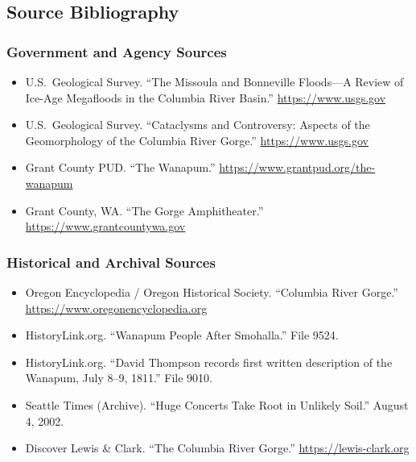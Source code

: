 \documentclass[11pt,letterpaper]{article}
\begin{document}
\subsection{Source Bibliography}

\subsubsection{Government and Agency Sources}
\begin{itemize}[noitemsep]
  \item U.S.\ Geological Survey. ``The Missoula and Bonneville Floods---A Review of Ice-Age Megafloods in the Columbia River Basin.'' \url{https://www.usgs.gov}
  \item U.S.\ Geological Survey. ``Cataclysms and Controversy: Aspects of the Geomorphology of the Columbia River Gorge.'' \url{https://www.usgs.gov}
  \item Grant County PUD. ``The Wanapum.'' \url{https://www.grantpud.org/the-wanapum}
  \item Grant County, WA. ``The Gorge Amphitheater.'' \url{https://www.grantcountywa.gov}
\end{itemize}

\subsubsection{Historical and Archival Sources}
\begin{itemize}[noitemsep]
  \item Oregon Encyclopedia / Oregon Historical Society. ``Columbia River Gorge.'' \url{https://www.oregonencyclopedia.org}
  \item HistoryLink.org. ``Wanapum People After Smohalla.'' File 9524.
  \item HistoryLink.org. ``David Thompson records first written description of the Wanapum, July 8--9, 1811.'' File 9010.
  \item Seattle Times (Archive). ``Huge Concerts Take Root in Unlikely Soil.'' August 4, 2002.
  \item Discover Lewis \& Clark. ``The Columbia River Gorge.'' \url{https://lewis-clark.org}
\end{itemize}
\end{document}
